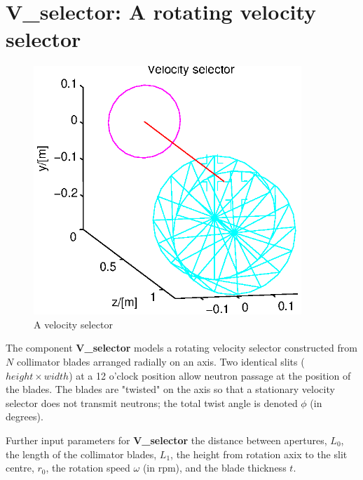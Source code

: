 \section{V\_selector: A rotating velocity selector}
\label{vselector}


\begin{figure}
  \begin{center}
    \includegraphics[width=0.9\textwidth]{figures/vselector.eps}
  \end{center}
\caption{A velocity selector}
\label{f:vselector}
\end{figure}

The component {\bf V\_selector} models a rotating velocity
selector constructed from $N$ collimator blades
arranged radially on an axis. Two identical slits ($height \times width$)
at a 12 o'clock position allow
neutron passage at the position of the blades.
The blades are "twisted" on the axis so that a stationary
velocity selector does not transmit neutrons; the total
twist angle is denoted $\phi$ (in degrees).

Further input parameters for {\bf V\_selector} 
the distance between apertures, $L_0$, the length of the
collimator blades, $L_1$, the height from rotation axix to the slit
centre, $r_0$, the rotation speed $\omega$ (in rpm), 
and the blade thickness $t$.


